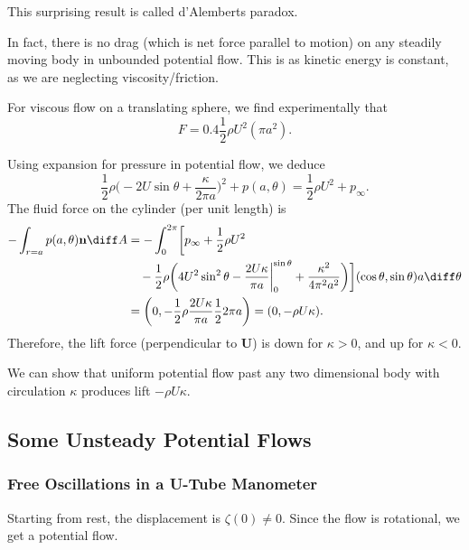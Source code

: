 \documentclass[12pt]{article}
\begin{document}
This surprising result is called d'Alemberts paradox.

In fact, there is no drag (which is net force parallel to motion) on any steadily moving body in unbounded potential flow. This is as kinetic energy is constant, as we are neglecting viscosity/friction.

For viscous flow on a translating sphere, we find experimentally that
\[
F = 0.4 \frac{1}{2} \rho U^2 (\pi a^2).
\]


Using expansion for pressure in potential flow, we deduce
\[
\frac{1}{2} \rho \biggl(-2U \sin \theta + \frac{\kappa}{2 \pi a} \biggr)^2 + p(a, \theta) = \frac{1}{2} \rho U^2 + p_{\infty}.
\]
The fluid force on the cylinder (per unit length) is
\begin{align*}
- \int_{r = a}p(a, \theta) \mathbf{n} \diff A &= - \int_{0}^{2 \pi} \biggl[p_{\infty} + \frac{1}{2} \rho U^2 \\
					      &\quad- \frac{1}{2} \rho \biggl(4U^2 \sin^2 \theta - \frac{2U\kappa}{\pi a} \biggr|_0^{\sin\theta} + \frac{\kappa^2}{4 \pi^2a^2} \biggr) \biggr] (\cos \theta, \sin \theta) a \diff \theta \\
					      &= \biggl(0, -\frac{1}{2}\rho \frac{2 U \kappa}{\pi a} \frac{1}{2} 2 \pi a\biggr) = (0, -\rho U \kappa).
\end{align*}
Therefore, the lift force (perpendicular to $\mathbf{U}$) is down for $\kappa > 0$, and up for $\kappa < 0$.

We can show that uniform potential flow past any two dimensional body with circulation $\kappa$ produces lift $-\rho U \kappa$.

\subsection{Some Unsteady Potential Flows}
\label{sub:some_unsteady_potential_flows}

\subsubsection{Free Oscillations in a U-Tube Manometer}
\label{subsub:free_oscillations_in_a_u_tube_manometer}

Starting from rest, the displacement is $\zeta(0) \neq 0$. Since the flow is rotational, we get a potential flow.
\end{document}
